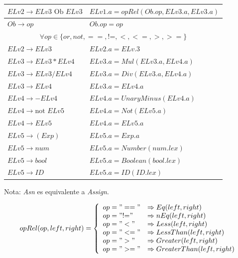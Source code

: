 \documentclass{article}
\begin{document}
\begin{table}[ht!]
\begin{tabular}{|p{4.2cm}|p{7.2cm}|}
		$ELv2 \rightarrow ELv3\text{ Ob } ELv3$ & $ELv1.a = opRel(Ob.op, ELv3.a, ELv3.a)$ \\ \hline
		
		$Ob \rightarrow op$ & $Ob.op = op$ \\ \hline
		
		\multicolumn{2}{|c|}{$\forall op\in\{or, not, ==, \text{!=}, <, <=, >, >=\}$} \\ \hline
		
		$ELv2 \rightarrow ELv3$ & $ELv2.a = ELv.3$ \\ \hline
		
		$ELv3 \rightarrow ELv3 * ELv4$ & $ELv3.a = Mul(ELv3.a, ELv4.a)$ \\ \hline
		$ELv3 \rightarrow ELv3 / ELv4$ & $ELv3.a = Div(ELv3.a, ELv4.a)$ \\ \hline
		
		$ELv3 \rightarrow ELv4$ & $ELv3.a = ELv4.a$ \\ \hline
		
		$ELv4 \rightarrow - ELv4$ & $ELv4.a = UnaryMinus(ELv4.a)$ \\ \hline
		$ELv4 \rightarrow \text{not }ELv5$ & $ELv4.a = Not(ELv5.a)$ \\ \hline
		
		$ELv4 \rightarrow ELv5$ & $ELv4.a = ELv5.a$ \\ \hline
		
		$ELv5 \rightarrow ( Exp )$ & $ELv5.a = Exp.a$ \\ \hline
		$ELv5 \rightarrow num$ & $ELv5.a = Number(num.lex)$ \\ \hline
		$ELv5 \rightarrow bool$ & $ELv5.a = Boolean(bool.lex)$ \\ \hline
		$ELv5 \rightarrow ID$ & $ELv5.a = ID(ID.lex)$ \\ \hline
		
	\end{tabular}
\end{table}
Nota: \textit{Asn} es equivalente a \textit{Assign}.

\[
opRel(op, left, right)=\left\{
\begin{array}{ll}
op = "=="  &\Rightarrow Eq(left, right)\\
op = "\text{!=}" & \Rightarrow nEq(left, right)\\
op = "<" &\Rightarrow Less(left, right)\\
op = "<=" &\Rightarrow LessThan(left, right)\\
op = ">" &\Rightarrow Greater(left, right)\\
op = ">=" &\Rightarrow GreaterThan(left, right)\\
\end{array}
\right.
\]
\end{document}
